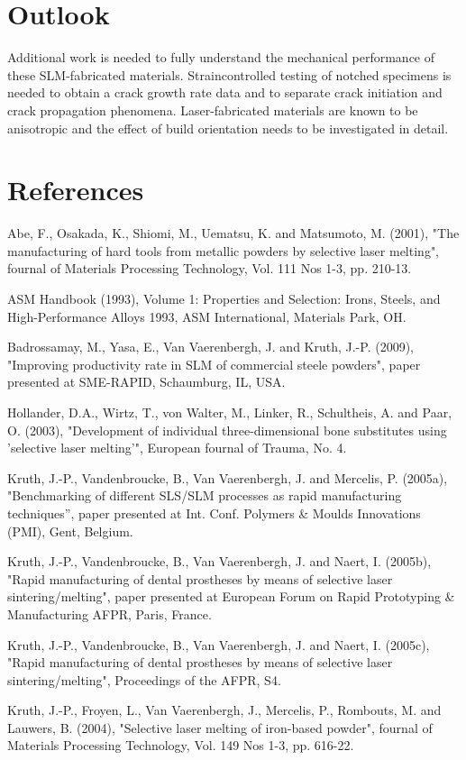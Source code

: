 \documentclass[10pt]{article}
\begin{document}
\section*{Outlook}
Additional work is needed to fully understand the mechanical performance of these SLM-fabricated materials. Straincontrolled testing of notched specimens is needed to obtain a crack growth rate data and to separate crack initiation and crack propagation phenomena. Laser-fabricated materials are known to be anisotropic and the effect of build orientation needs to be investigated in detail.

\section*{References}
Abe, F., Osakada, K., Shiomi, M., Uematsu, K. and Matsumoto, M. (2001), "The manufacturing of hard tools from metallic powders by selective laser melting", fournal of Materials Processing Technology, Vol. 111 Nos 1-3, pp. 210-13.

ASM Handbook (1993), Volume 1: Properties and Selection: Irons, Steels, and High-Performance Alloys 1993, ASM International, Materials Park, $\mathrm{OH}$.

Badrossamay, M., Yasa, E., Van Vaerenbergh, J. and Kruth, J.-P. (2009), "Improving productivity rate in SLM of commercial steele powders", paper presented at SME-RAPID, Schaumburg, IL, USA.

Hollander, D.A., Wirtz, T., von Walter, M., Linker, R., Schultheis, A. and Paar, O. (2003), "Development of individual three-dimensional bone substitutes using 'selective laser melting'", European fournal of Trauma, No. 4.

Kruth, J.-P., Vandenbroucke, B., Van Vaerenbergh, J. and Mercelis, P. (2005a), "Benchmarking of different SLS/SLM processes as rapid manufacturing techniques”, paper presented at Int. Conf. Polymers \& Moulds Innovations (PMI), Gent, Belgium.

Kruth, J.-P., Vandenbroucke, B., Van Vaerenbergh, J. and Naert, I. (2005b), "Rapid manufacturing of dental prostheses by means of selective laser sintering/melting", paper presented at European Forum on Rapid Prototyping \& Manufacturing AFPR, Paris, France.

Kruth, J.-P., Vandenbroucke, B., Van Vaerenbergh, J. and Naert, I. (2005c), "Rapid manufacturing of dental prostheses by means of selective laser sintering/melting", Proceedings of the AFPR, S4.

Kruth, J.-P., Froyen, L., Van Vaerenbergh, J., Mercelis, P., Rombouts, M. and Lauwers, B. (2004), "Selective laser melting of iron-based powder", fournal of Materials Processing Technology, Vol. 149 Nos 1-3, pp. 616-22.
\end{document}
